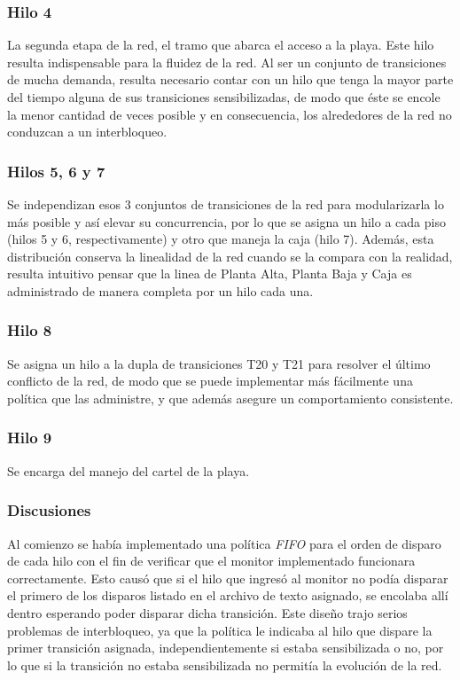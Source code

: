 \documentclass[12pt,a4paper]{article}
\begin{document}
\subsubsection*{Hilo 4}
La segunda etapa de la red, el tramo que abarca el acceso a la playa.
Este hilo resulta indispensable para la fluidez de la red. Al ser un conjunto de transiciones de mucha demanda, resulta necesario contar con un hilo que tenga la mayor parte del tiempo alguna de sus transiciones sensibilizadas, de modo que éste se encole la menor cantidad de veces posible y en consecuencia, los alrededores de la red no conduzcan a un interbloqueo.
\subsubsection*{Hilos 5, 6 y 7}
Se independizan esos 3 conjuntos de transiciones de la red para modularizarla lo más posible y así elevar su concurrencia, por lo que se asigna un hilo a cada piso (hilos 5 y 6, respectivamente) y otro que maneja la caja (hilo 7). Además, esta distribución conserva la linealidad de la red cuando se la compara con la realidad, resulta intuitivo pensar que la linea de Planta Alta, Planta Baja y Caja es administrado de manera completa por un hilo cada una.
\subsubsection*{Hilo 8}
Se asigna un hilo a la dupla de transiciones T20 y T21 para resolver el último conflicto de la red, de modo que se puede implementar más fácilmente una política que las administre, y que además asegure un comportamiento consistente. 
\subsubsection*{Hilo 9}
Se encarga del manejo del cartel de la playa.

\subsubsection*{Discusiones}
Al comienzo se había implementado una política \emph{FIFO} para el orden de disparo de cada hilo con el fin de verificar que el monitor implementado funcionara correctamente. Esto causó que si el hilo que ingresó al monitor no podía disparar el primero de los disparos listado en el archivo de texto asignado, se encolaba allí dentro esperando poder disparar dicha transición. Este diseño trajo serios problemas de interbloqueo, ya que la política le indicaba al hilo que dispare la primer transición asignada, independientemente si estaba sensibilizada o no, por lo que si la transición no estaba sensibilizada no permitía la evolución de la red.
\end{document}
